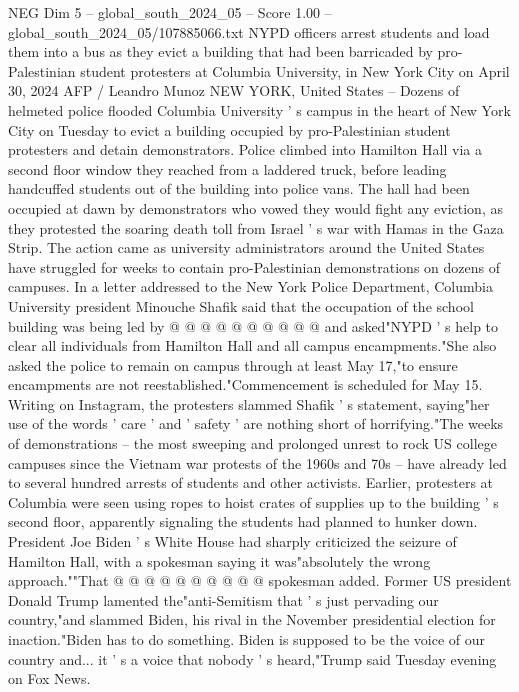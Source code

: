 \begin{textsample}{NEG Dim 5 – global\_south\_2024\_05 – Score 1.00 – global\_south\_2024\_05/107885066.txt}  \label{ex:f5_neg_387}
NYPD officers arrest students and load them into a bus as they evict a building that had been barricaded by pro-Palestinian student protesters at Columbia University, in New York City on April 30, 2024 AFP / Leandro Munoz NEW YORK, United States -- Dozens of helmeted police flooded Columbia University ' s campus in the heart of New York City on Tuesday to evict a building occupied by pro-Palestinian student protesters and detain demonstrators.
Police climbed into Hamilton Hall via a second floor window they reached from a laddered truck, before leading handcuffed students out of the building into police vans.
The hall had been occupied at dawn by demonstrators who vowed they would fight any eviction, as they protested the soaring death toll from Israel ' s war with Hamas in the Gaza Strip.
The action came as university administrators around the United States have struggled for weeks to contain pro-Palestinian demonstrations on dozens of campuses.
In a letter addressed to the New York Police Department, Columbia University president Minouche Shafik said that the occupation of the school building was being led by @ @ @ @ @ @ @ @ @ @ and asked"NYPD ' s help to clear all individuals from Hamilton Hall and all campus encampments."She also asked the police to remain on campus through at least May 17,"to ensure encampments are not reestablished."Commencement is scheduled for May 15.
Writing on Instagram, the protesters slammed Shafik ' s statement, saying"her use of the words ' care ' and ' safety ' are nothing short of horrifying."The weeks of demonstrations -- the most sweeping and prolonged unrest to rock US college campuses since the Vietnam war protests of the 1960s and 70s -- have already led to several hundred arrests of students and other activists.
Earlier, protesters at Columbia were seen using ropes to hoist crates of supplies up to the building ' s second floor, apparently signaling the students had planned to hunker down.
President Joe Biden ' s White House had sharply criticized the seizure of Hamilton Hall, with a spokesman saying it was"absolutely the wrong approach.""That @ @ @ @ @ @ @ @ @ @ spokesman added.
Former US president Donald Trump lamented the"anti-Semitism that ' s just pervading our country,"and slammed Biden, his rival in the November presidential election for inaction."Biden has to do something.
Biden is supposed to be the voice of our country and... it ' s a voice that nobody ' s heard,"Trump said Tuesday evening on Fox News.

\end{textsample}
